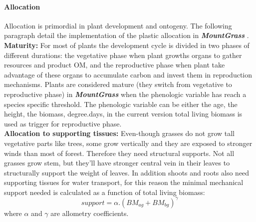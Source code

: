 \documentclass[a4paper,twoside, justified,marginals=raggedright, nobib]{tufte-handout}
\newcommand{\model}{\textit{\textbf{MountGrass }}}
\begin{document}
\paragraph{Allocation} \label{par:allocation}
Allocation is primordial in plant development and ontogeny. The following paragraph detail the implementation of the plastic allocation in \model.\\

\textbf{Maturity:} For most of plants the development cycle is divided in two phases of different durations: the vegetative phase when plant growths organs to gather resources and product OM, and the reproductive phase when plant take advantage of these organs to accumulate carbon and invest them in reproduction mechanisms. Plants are considered mature (they switch from vegetative to reproductive phase) in \model when the phenologic variable has reach a species specific threshold. The phenologic variable can be either the age, the height, the biomass, degree.days, in the current version total living biomass is used as trigger for reproductive phase.\\

\textbf{Allocation to supporting tissues:} Even-though grasses do not grow tall vegetative parts like trees, some grow vertically and they are exposed to stronger winds than most of forest. Therefore they need structural supports. Not all grasses grow stem, but they'll have stronger central vein in their leaves to structurally support the weight of leaves. In addition shoots and roots also need supporting tissues for water transport, for this reason the minimal mechanical support needed is calculated as a function of total living biomass:
\begin{equation}
support = \alpha . (BM_{ag} + BM_{bg})^\gamma
\end{equation}
where $\alpha$ and $\gamma$ are allometry coefficients.\\
\end{document}
